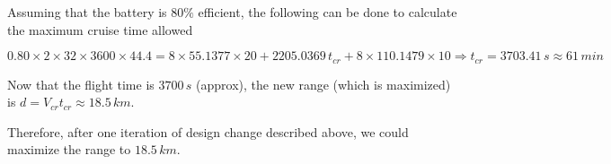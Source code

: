 Assuming that the battery is $80\%$ efficient, the following can be done to calculate the maximum cruise time allowed

\begin{equation*}
    0.80 \times 2 \times 32 \times 3600 \times 44.4 = 8 \times 55.1377 \times 20 + 2205.0369 \, t_{cr} + 8 \times 110.1479 \times 10
    \Rightarrow t_{cr} = 3703.41\,s \approx 61 \, min
\end{equation*}

Now that the flight time is $3700\,s$ (approx), the new range (which is maximized) is $d = V_{cr} t_{cr} \approx 18.5\,km$.

Therefore, after one iteration of design change described above, we could maximize the range to $18.5\,km$.
